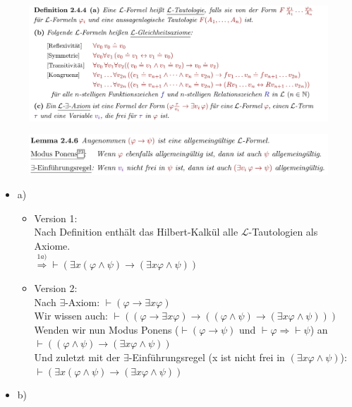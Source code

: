 \documentclass[a4paper]{scrartcl}
\begin{document}
    \begin{figure}[H]
        \centering
        \includegraphics[scale=0.3]{./Allg.png}
        \label{fig:./Allg}
    \end{figure}

    \begin{figure}[H]
        \centering
        \includegraphics[scale=0.3]{./MP.png}
        \label{fig:./MP}
    \end{figure}

    \begin{itemize}
        \item a)\\
            \begin{itemize}
                \item Version 1:\\
                    Nach Definition enthält das Hilbert-Kalkül alle $\mathscr{L}$-Tautologien als Axiome.\\
                    $\overset{1 a)}{\Rightarrow} \vdash (\exists x(\varphi \land \psi) \rightarrow (\exists x \varphi \land \psi))$\\
                \item Version 2:\\
                    Nach $\exists$-Axiom: $\vdash (\varphi \rightarrow \exists x \varphi)$\\
                    Wir wissen auch: $\vdash ((\varphi \rightarrow \exists x \varphi) \rightarrow ((\varphi \land \psi) \rightarrow (\exists x \varphi \land \psi)))$\\
                    Wenden wir nun Modus Ponens ($\vdash (\varphi \rightarrow \psi)$ und $\vdash \varphi \Rightarrow \vdash \psi$) an\\
                    $\vdash ((\varphi \land \psi) \rightarrow (\exists x \varphi \land \psi))$\\
                    Und zuletzt mit der $\exists$-Einführungsregel (x ist nicht frei in $(\exists x \varphi \land \psi)$):\\
                    $\vdash (\exists x(\varphi \land \psi) \rightarrow (\exists x \varphi \land \psi))$\\
            \end{itemize}
        \item b)\\

    \end{itemize}%
\end{document}
